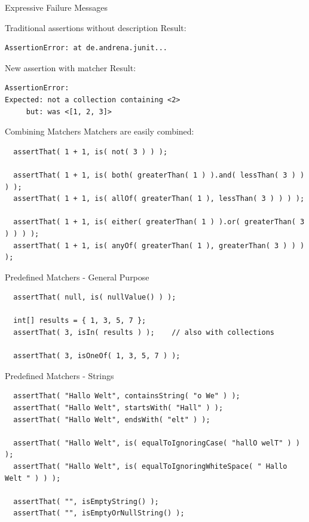 \begin{frame}[fragile]{Expressive Failure Messages}
    \begin{block}{Traditional assertions without description}
Result:
\begin{lstlisting}
AssertionError: at de.andrena.junit...
\end{lstlisting}
    \end{block}	
\pause
    \begin{block}{New assertion with matcher}
Result:
\begin{lstlisting}
AssertionError:
Expected: not a collection containing <2>
     but: was <[1, 2, 3]>
\end{lstlisting}
    \end{block}
\end{frame}


\begin{frame}[fragile]{Combining Matchers}
	Matchers are easily combined:

\begin{lstlisting}
  assertThat( 1 + 1, is( not( 3 ) ) );

  assertThat( 1 + 1, is( both( greaterThan( 1 ) ).and( lessThan( 3 ) ) ) );
  assertThat( 1 + 1, is( allOf( greaterThan( 1 ), lessThan( 3 ) ) ) );

  assertThat( 1 + 1, is( either( greaterThan( 1 ) ).or( greaterThan( 3 ) ) ) );
  assertThat( 1 + 1, is( anyOf( greaterThan( 1 ), greaterThan( 3 ) ) ) );
\end{lstlisting}

\end{frame}

\begin{frame}[fragile]{Predefined Matchers - General Purpose}
\begin{lstlisting}
  assertThat( null, is( nullValue() ) );

  int[] results = { 1, 3, 5, 7 };
  assertThat( 3, isIn( results ) );    // also with collections

  assertThat( 3, isOneOf( 1, 3, 5, 7 ) );
\end{lstlisting}
\end{frame}


\begin{frame}[fragile]{Predefined Matchers - Strings}
\begin{lstlisting}
  assertThat( "Hallo Welt", containsString( "o We" ) );
  assertThat( "Hallo Welt", startsWith( "Hall" ) );
  assertThat( "Hallo Welt", endsWith( "elt" ) );
        
  assertThat( "Hallo Welt", is( equalToIgnoringCase( "hallO welT" ) ) );
  assertThat( "Hallo Welt", is( equalToIgnoringWhiteSpace( " Hallo    Welt " ) ) );

  assertThat( "", isEmptyString() );
  assertThat( "", isEmptyOrNullString() );
\end{lstlisting}
\end{frame}


